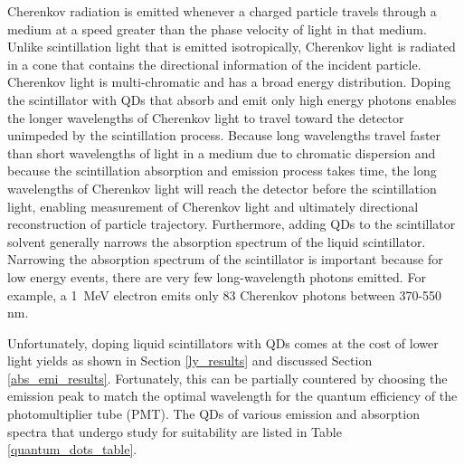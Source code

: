 \documentclass{JINST}
\begin{document}
Cherenkov radiation is emitted whenever a charged particle travels through a medium at a speed greater than the phase velocity of light in that medium. Unlike scintillation light that is emitted isotropically, Cherenkov light is radiated in a cone that contains the directional information of the incident particle. Cherenkov light is multi-chromatic and has a broad energy distribution. Doping the scintillator with QDs that absorb and emit only high energy photons enables the longer wavelengths of Cherenkov light to travel toward the detector unimpeded by the scintillation process. Because long wavelengths travel faster than short wavelengths of light in a medium due to chromatic dispersion and because the scintillation absorption and emission process takes time, the long wavelengths of Cherenkov light will reach the detector before the scintillation light, enabling measurement of Cherenkov light and ultimately directional reconstruction of particle trajectory.  Furthermore, adding QDs to the scintillator solvent generally narrows the absorption spectrum of the liquid scintillator. Narrowing the absorption spectrum of the scintillator is important because for low energy events, there are very few long-wavelength photons emitted. For example, a 1~MeV electron emits only 83 Cherenkov photons between 370-550 nm\cite{lindley14}. 

Unfortunately, doping liquid scintillators with QDs comes at the cost of lower light yields as shown in Section \ref{ly_results} and discussed Section \ref{abs_emi_results}. Fortunately, this can be partially countered by choosing the emission peak to match the optimal wavelength for the quantum efficiency of the photomultiplier tube (PMT)\cite{hamamatsupmt}. The QDs of various emission and absorption spectra that undergo study for suitability are listed in Table \ref{quantum_dots_table}.
 
\end{document}
